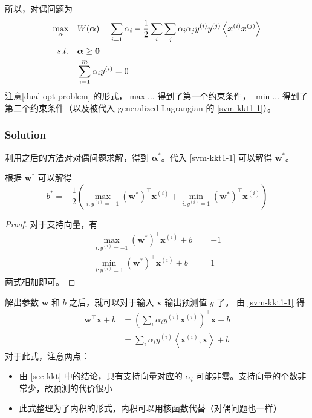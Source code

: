 		所以，对偶问题为
		\begin{align}
			\max_{\bm{\alpha}} \quad & W(\bm{\alpha}) = \sum_{i=1}{\alpha_i} - \frac{1}{2} \sum_i \sum_j {\alpha_i \alpha_j y^{(i)} y^{(j)} \left\langle \bm{x}^{(i)} \bm{x}^{(j)} \right\rangle } \\
			s.t. \quad & \bm{\alpha} \geq \bm{0} \\
			& \sum_{i=1}^{m} \alpha_i y^{(i)} = 0
		\end{align}
		注意\eqref{dual-opt-problem} 的形式，$ \max \ldots $ 得到了第一个约束条件，
		$ \min \ldots $ 得到了第二个约束条件（以及被代入 generalized Lagrangian 的 \eqref{svm-kkt1-1}）。
		
	\subsubsection{Solution}
		利用之后的方法对对偶问题求解，得到 $ \bm{\alpha}^* $。代入 \eqref{svm-kkt1-1} 可以解得 $ \bm{w}^* $。
		
		根据 $ \bm{w}^* $ 可以解得
		\begin{equation}
			b^* = - \frac{1}{2} \left( \max_{i: y^{(i)} = -1} (\bm{w}^*)^\intercal \bm{x}^{(i)} + \min_{i: y^{(i)} = 1} (\bm{w}^*)^\intercal \bm{x}^{(i)} \right) \label{svm-commonly-solving-b}
		\end{equation}
		\begin{proof}
			对于支持向量，有
			\begin{align*}
				\max_{i: y^{(i)} = -1} (\bm{w}^*)^\intercal \bm{x}^{(i)} + b & = -1 \\
				\min_{i: y^{(i)} = 1} (\bm{w}^*)^\intercal \bm{x}^{(i)} + b & = 1
			\end{align*}
			两式相加即可。
		\end{proof}
		
		解出参数 $ \bm{w} $ 和 $ b $ 之后，就可以对于输入 $ \bm{x} $ 输出预测值 $ y $ 了。
		由 \eqref{svm-kkt1-1} 得
		\begin{align}
			\bm{w}^\intercal \bm{x} + b &= \left( \sum_i \alpha_i y^{(i)} \bm{x}^{(i)} \right)^\intercal \bm{x} + b \\
			&= \sum_i \alpha_i y^{(i)} \left\langle \bm{x}^{(i)}, \bm{x} \right\rangle + b
		\end{align}
		对于此式，注意两点：
		\begin{itemize}
			\item 由 \ref{sec-kkt} 中的结论，只有支持向量对应的 $ \alpha_i $ 可能非零。支持向量的个数非常少，故预测的代价很小
			\item 此式整理为了内积的形式，内积可以用核函数代替（对偶问题也一样）
		\end{itemize}
		
